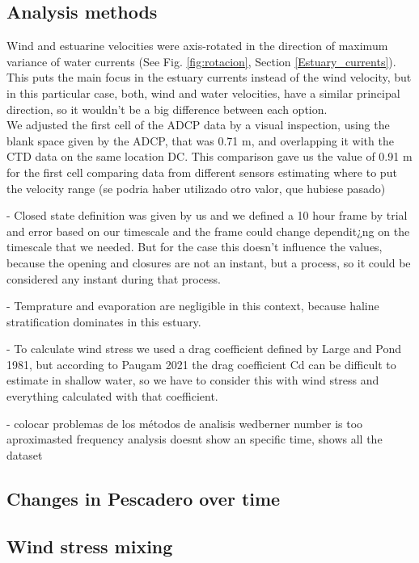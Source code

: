 \documentclass[tesis.tex]{subfiles}
\begin{document}
\subsection{Analysis methods}

Wind and estuarine velocities were axis-rotated in the direction of maximum variance of water currents (See Fig. \ref{fig:rotacion}, Section \ref{Estuary_currents}). This puts the main focus in the estuary currents instead of the wind velocity, but in this particular case, both, wind and water velocities, have a similar principal direction, so it wouldn't be a big difference between each option.\\

We adjusted the first cell of the ADCP data by a visual inspection, using the blank space given by the ADCP, that was 0.71 m, and overlapping it with the CTD data on the same location DC. This comparison gave us the value of 0.91 m for the first cell    
comparing data from different sensors estimating where to put the velocity range (se podria haber utilizado otro valor, que hubiese pasado)

- Closed state definition was given by us and we defined a 10 hour frame by trial and error based on our timescale and the frame could change dependit¿ng on the timescale that we needed. But for the case this doesn't influence the values, because the opening and closures are not an instant, but a process, so it could be considered any instant during that process.

- Temprature and evaporation are negligible in this context, because haline stratification dominates in this estuary.

- To calculate wind stress we used a drag coefficient defined by Large and Pond 1981, but according to Paugam 2021 the drag coefficient Cd can be difficult to estimate in shallow water, so we have to consider this with wind stress and everything calculated with that coefficient.

- colocar problemas de los métodos de analisis
wedberner number is too aproximasted
frequency analysis doesnt show an specific time, shows all the dataset




\subsection{Changes in Pescadero over time}

\subsection{Wind stress mixing}
\end{document}

